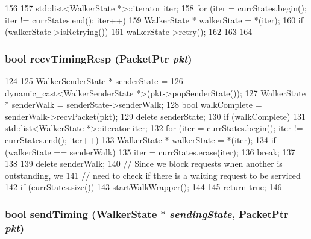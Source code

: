 \begin{DoxyCode}
156 {
157     std::list<WalkerState *>::iterator iter;
158     for (iter = currStates.begin(); iter != currStates.end(); iter++) {
159         WalkerState * walkerState = *(iter);
160         if (walkerState->isRetrying()) {
161             walkerState->retry();
162         }
163     }
164 }
\end{DoxyCode}
\hypertarget{classX86ISA_1_1Walker_a482dba5588f4bee43e498875a61e5e0b}{
\subsubsection[{recvTimingResp}]{\setlength{\rightskip}{0pt plus 5cm}bool recvTimingResp ({\bf PacketPtr} {\em pkt})}}
\label{classX86ISA_1_1Walker_a482dba5588f4bee43e498875a61e5e0b}



\begin{DoxyCode}
124 {
125     WalkerSenderState * senderState =
126         dynamic_cast<WalkerSenderState *>(pkt->popSenderState());
127     WalkerState * senderWalk = senderState->senderWalk;
128     bool walkComplete = senderWalk->recvPacket(pkt);
129     delete senderState;
130     if (walkComplete) {
131         std::list<WalkerState *>::iterator iter;
132         for (iter = currStates.begin(); iter != currStates.end(); iter++) {
133             WalkerState * walkerState = *(iter);
134             if (walkerState == senderWalk) {
135                 iter = currStates.erase(iter);
136                 break;
137             }
138         }
139         delete senderWalk;
140         // Since we block requests when another is outstanding, we
141         // need to check if there is a waiting request to be serviced
142         if (currStates.size())
143             startWalkWrapper();
144     }
145     return true;
146 }
\end{DoxyCode}
\hypertarget{classX86ISA_1_1Walker_ad26bf3182653f73846811f045dcaafb6}{
\subsubsection[{sendTiming}]{\setlength{\rightskip}{0pt plus 5cm}bool sendTiming ({\bf WalkerState} $\ast$ {\em sendingState}, \/  {\bf PacketPtr} {\em pkt})}}
\label{classX86ISA_1_1Walker_ad26bf3182653f73846811f045dcaafb6}



